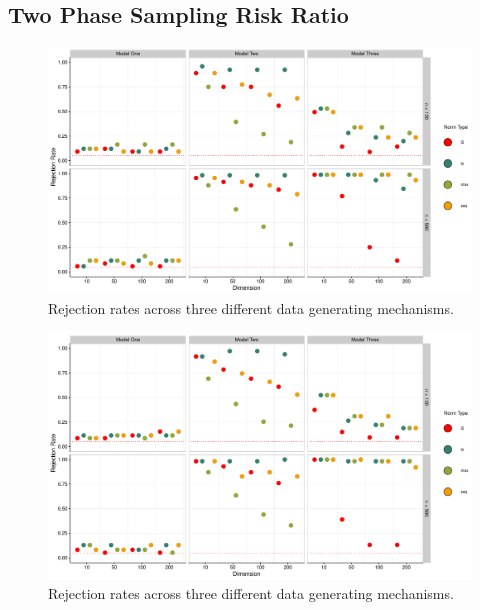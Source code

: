 \documentclass{article}
\begin{document}

\subsection*{Two Phase Sampling Risk Ratio}

\begin{figure}[]
	\centering
\includegraphics[width = \linewidth]{magnitude.pdf}
	\caption{Rejection rates across three different data generating mechanisms.}
	\label{fig:magnitude}
\end{figure}

\begin{figure}[]
	\centering
\includegraphics[width = \linewidth]{power.pdf}
	\caption{Rejection rates across three different data generating mechanisms.}
	\label{fig:magnitude}
\end{figure}
\end{document}
